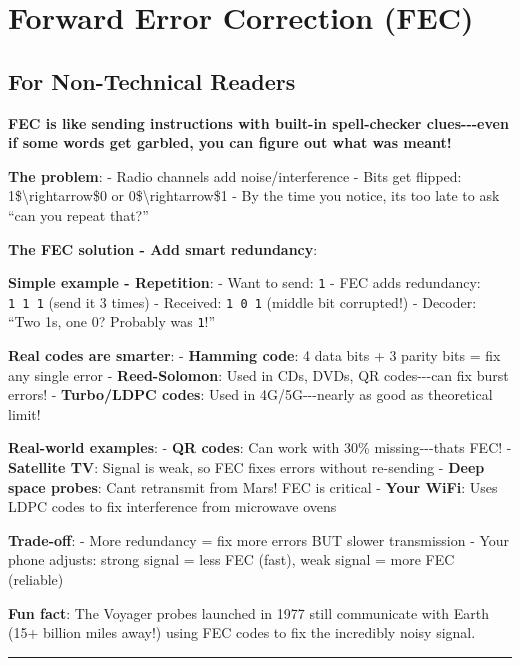 \section{Forward Error Correction
(FEC)}\label{forward-error-correction-fec}

\subsection{\texorpdfstring{ For Non-Technical
Readers}{ For Non-Technical Readers}}\label{for-non-technical-readers}

\textbf{FEC is like sending instructions with built-in spell-checker
clues-\/-\/-even if some words get garbled, you can figure out what was
meant!}

\textbf{The problem}: - Radio channels add noise/interference - Bits get
flipped: 1\$\textbackslash rightarrow\$0 or
0\$\textbackslash rightarrow\$1 - By the time you notice,
it\textquotesingle s too late to ask ``can you repeat that?''

\textbf{The FEC solution - Add smart redundancy}:

\textbf{Simple example - Repetition}: - Want to send: \texttt{1} - FEC
adds redundancy: \texttt{1\ 1\ 1} (send it 3 times) - Received:
\texttt{1\ 0\ 1} (middle bit corrupted!) - Decoder: ``Two 1s, one 0?
Probably was \texttt{1}!''

\textbf{Real codes are smarter}: - \textbf{Hamming code}: 4 data bits +
3 parity bits = fix any single error - \textbf{Reed-Solomon}: Used in
CDs, DVDs, QR codes-\/-\/-can fix burst errors! - \textbf{Turbo/LDPC
codes}: Used in 4G/5G-\/-\/-nearly as good as theoretical limit!

\textbf{Real-world examples}: - \textbf{QR codes}: Can work with 30\%
missing-\/-\/-that\textquotesingle s FEC! - \textbf{Satellite TV}:
Signal is weak, so FEC fixes errors without re-sending - \textbf{Deep
space probes}: Can\textquotesingle t retransmit from Mars! FEC is
critical - \textbf{Your WiFi}: Uses LDPC codes to fix interference from
microwave ovens

\textbf{Trade-off}: - More redundancy = fix more errors BUT slower
transmission - Your phone adjusts: strong signal = less FEC (fast), weak
signal = more FEC (reliable)

\textbf{Fun fact}: The Voyager probes launched in 1977 still communicate
with Earth (15+ billion miles away!) using FEC codes to fix the
incredibly noisy signal.

\begin{center}\rule{0.5\linewidth}{0.5pt}\end{center}

